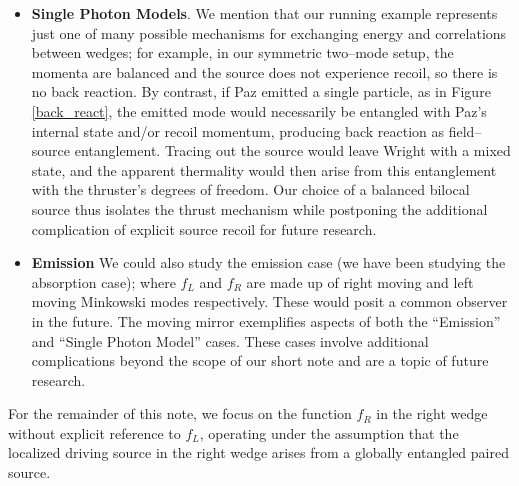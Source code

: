 \documentclass[12pt,a4paper]{article}
\begin{document}
{\begin{itemize}
\item {\bf Single Photon Models}. We mention that our running example represents just one of many possible mechanisms for exchanging energy and correlations between wedges; for example, in our symmetric two–mode setup, the momenta are balanced and the source does not experience recoil, so there is no back reaction. By contrast, if Paz emitted a single particle, as in Figure \ref{back_react}, the emitted mode would necessarily be entangled with Paz’s internal state and/or recoil momentum, producing back reaction as field–source entanglement. Tracing out the source would leave Wright with a mixed state, and the apparent thermality would then arise from this entanglement with the thruster’s degrees of freedom. Our choice of a balanced bilocal source thus isolates the thrust mechanism while postponing the additional complication of explicit source recoil for future research.

\item {\bf Emission} We could also study the emission case (we have been studying the absorption case); where $f_L$ and $f_R$ are made up of right moving and left moving Minkowski modes respectively.  These would posit a common observer in the future. The moving mirror exemplifies aspects of both the ``Emission'' and ``Single Photon Model'' cases. These cases involve additional complications beyond the scope of our short note and are a topic of future research.
\end{itemize}

For the remainder of this note, we focus on the function $f_R$ in the right wedge without explicit reference to $f_L$, operating under the assumption that the localized driving source in the right wedge arises from a globally entangled paired source.

}
\end{document}

